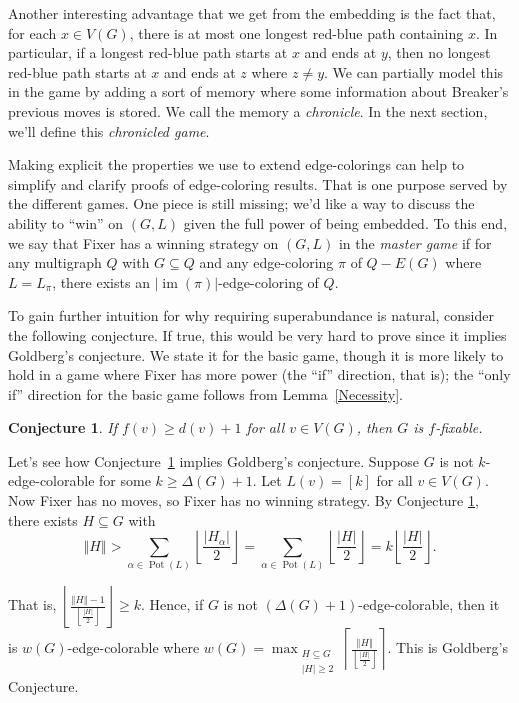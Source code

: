 \documentclass[12pt,reqno]{amsart}
\theoremstyle{plain}
\newtheorem{conj}[thm]{Conjecture}
\theoremstyle{definition}
\theoremstyle{remark}
\newcommand{\card}[1]{\left|#1\right|}
\newcommand{\size}[1]{\left\Vert#1\right\Vert}
\newcommand{\ceil}[1]{\left\lceil#1\right\rceil}
\newcommand{\floor}[1]{\left\lfloor#1\right\rfloor}
\newcommand{\irange}[1]{\left[#1\right]}
\newcommand{\im}{\operatorname{im}}
\newcommand{\pot}{\operatorname{Pot}}
\begin{document}
Another interesting advantage that we get from the embedding is the fact that, for each $x \in V(G)$, there is at most one longest red-blue path containing $x$.  In particular, if a longest red-blue path starts at $x$ and ends at $y$, then no longest red-blue path starts at $x$ and ends at $z$ where $z \ne y$.  We can partially model this in the game by adding a sort of memory where some information about Breaker's previous moves is stored.  We call the memory a \emph{chronicle}.  In the next section, we'll define this \emph{chronicled game}.

Making explicit the properties we use to extend edge-colorings can help to simplify and clarify proofs of edge-coloring results.  That is one purpose served by the different games.  One piece is still missing; we'd like a way to discuss the ability to ``win'' on $(G, L)$ given the full power of being embedded.  To this end, we say that Fixer has a winning strategy on $(G, L)$ in the \emph{master game} if for any multigraph $Q$ with $G \subseteq Q$ and any edge-coloring $\pi$ of $Q - E(G)$ where $L = L_\pi$, there exists an $\card{\im(\pi)}$-edge-coloring of $Q$.

To gain further intuition for why requiring superabundance is natural, consider
the following conjecture.  If true, this would be very hard to prove since it
implies Goldberg's conjecture.  We state it for the basic game, though it is
more likely to hold in a game where Fixer has more power (the ``if'' direction,
that is); the ``only if'' direction for the basic game follows from
Lemma~\ref{Necessity}.


\begin{conj}\label{GameGoldbergConjecture}
If $f(v) \ge d(v) + 1$ for all $v \in V(G)$, then $G$ is $f$-fixable.
\end{conj}

Let's see how Conjecture~\ref{GameGoldbergConjecture} implies Goldberg's
conjecture.  Suppose $G$ is not $k$-edge-colorable for some $k \ge \Delta(G) +
1$. Let $L(v) = \irange{k}$ for all $v \in V(G)$.  Now Fixer has no moves, so
Fixer has no winning strategy.
By Conjecture \ref{GameGoldbergConjecture}, there exists $H \subseteq G$
with 
\[
\size{H}
> \sum_{\alpha \in \pot(L)} \floor{\frac{\card{H_\alpha}}{2}} 
= \sum_{\alpha \in \pot(L)} \floor{\frac{|H|}{2}}
= k\floor{\frac{|H|}{2}}.
\] 

\noindent That is, $\floor{\frac{\size{H} - 1}{\floor{\frac{|H|}{2}}}}\ge k$. 
Hence,
if $G$ is not $(\Delta(G) + 1)$-edge-colorable, then it is  
$w(G)$-edge-colorable where $w(G) = \max_{\substack{H
\subseteq G\\|H| \ge 2}}\ceil{\frac{\size{H}}{\floor{\frac{|H|}{2}}}}.$ 
This is Goldberg's Conjecture.
\end{document}
